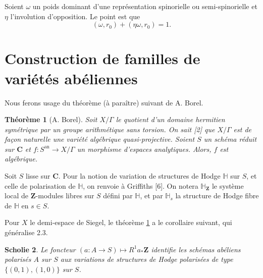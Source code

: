 \documentclass[11pt]{amsart}
\theoremstyle{plain}
\newtheorem{theoreme}{Th\'eor\`eme}[section]
\newtheorem{scholie}[theoreme]{Scholie}
\theoremstyle{definition}
\theoremstyle{remark}
\begin{document}
\vspace{0.5cm}
Soient $\omega$ un poids dominant d'une repr\'esentation spinorielle ou semi-spinorielle et $\eta$ l'involution d'opposition. Le point est que
\begin{equation*}
(\omega,r_0)+(\eta\omega,r_0)=1.
\end{equation*}

\section{Construction de familles de vari\'et\'es ab\'eliennes}

Nous ferons usage du th\'eor\`eme (\`a para\^itre) suivant de A. Borel.

\begin{theoreme}[A. Borel]\label{thm:borel}
Soit $X/\Gamma$ le quotient d'un domaine hermitien sym\'etrique par un groupe arithm\'etique sans torsion. On sait [2] que $X/\Gamma$ est de fa\c{c}on naturelle une vari\'et\'e alg\'ebrique quasi-projective. Soient $S$ un sch\'ema r\'eduit sur $\mathbf{C}$ et $f\colon S^{\mathrm{an}}\to X/\Gamma$ un morphisme d'espaces analytiques. Alors, $f$ est alg\'ebrique.
\end{theoreme}

Soit $S$ lisse sur $\mathbf{C}$. Pour la notion de variation de structures de Hodge $\mathbb{H}$ sur $S$, et celle de polarisation de $\mathbb{H}$, on renvoie \`a Griffiths [6]. On notera $\mathbb{H}_\mathbf{Z}$ le syst\`eme local de $\mathbf{Z}$-modules libres sur $S$ d\'efini par $\mathbb{H}$, et par $\mathbb{H}_s$ la structure de Hodge fibre de $\mathbb{H}$ en $s\in S$.

Pour $X$ le demi-espace de Siegel, le th\'eor\`eme \ref{thm:borel} a le corollaire suivant, qui g\'en\'eralise 2.3.

\begin{scholie}
Le foncteur $(a\colon A\to S)\mapsto R^1a_*\mathbf{Z}$ identifie les sch\'emas ab\'eliens polaris\'es $A$ sur $S$ aux variations de structures de Hodge polaris\'ees de type $\{(0,1),(1,0)\}$ sur $S$.
\end{scholie}
\end{document}
